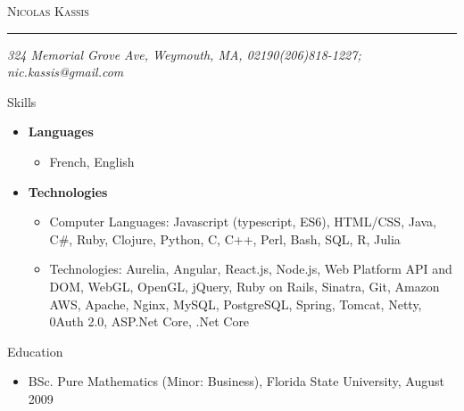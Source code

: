 \documentclass[10pt,oneside]{article}
\makeatletter
\newcommand{\name}{Nicolas Kassis}
\newcommand{\addr}{324 Memorial Grove Ave, Weymouth, MA, 02190}
\newcommand{\phone}{(206)818-1227}
\newcommand{\email}{nic.kassis@gmail.com}
\newcommand{\bigname}[1]{
  \begin{center}\fontfamily{phv}\selectfont\Huge\scshape#1\end{center}
}
\newenvironment{ressection}[1]{
  \vspace{4pt}
	 {\fontfamily{phv}\selectfont\Large#1}
	 \begin{itemize}
	   \vspace{3pt}
}{
	 \end{itemize}
}
\newcommand{\resitem}[1]{
  \vspace{-4pt}
\item \begin{flushleft} #1 \end{flushleft}
}
\newcommand{\ressubitem}[1]{
  \vspace{-1pt}
\item \begin{flushleft} #1 \end{flushleft}
}
\newenvironment{reslist}[1]{
  \resitem{\textbf{#1}}
  \vspace{-5pt}
  \begin{itemize}
}{
  \end{itemize}
}
\makeatother
\begin{document}
 \selectfont

\bigname{\name}
\vspace{-8pt} \rule{\textwidth}{1pt}
\vspace{-1pt} {\small\itshape \addr \hfill \phone; \email}
\vspace{8 pt}

\begin{ressection}{Skills}
  \begin{reslist}{Languages}
    \ressubitem{French, English}
   \end{reslist}
   \begin{reslist}{Technologies}
    \ressubitem{Computer Languages: Javascript (typescript, ES6), HTML/CSS, Java, C\#, Ruby, Clojure, Python, C, C++,  Perl, Bash, SQL, R, Julia}
    \ressubitem{Technologies: Aurelia, Angular, React.js, Node.js, Web Platform API and DOM, WebGL, OpenGL, jQuery, Ruby on Rails, Sinatra, Git, Amazon AWS, Apache, Nginx, MySQL, PostgreSQL, Spring, Tomcat, Netty, 0Auth 2.0, ASP.Net Core, .Net Core}
    \end{reslist}
\end{ressection}
\begin{ressection}{Education}
  \ressubitem{BSc. Pure Mathematics (Minor: Business), Florida State University, August 2009}
\end{ressection}
\end{document}
